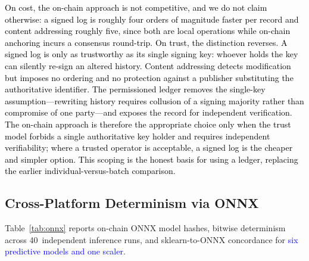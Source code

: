 \documentclass[conference]{IEEEtran}
\newcommand{\rev}[2]{\textcolor{blue}{#2}}
\begin{document}
\textcolor{black}{On cost, the on-chain approach is not competitive,
and we do not claim otherwise: a signed log is roughly four
orders of magnitude faster per record and content addressing
roughly five, since both are local operations while on-chain
anchoring incurs a consensus round-trip. On trust, the
distinction reverses. A signed log is only as trustworthy as
its single signing key: whoever holds the key can silently
re-sign an altered history. Content addressing detects
modification but imposes no ordering and no protection against a
publisher substituting the authoritative identifier. The
permissioned ledger removes the single-key assumption---rewriting
history requires collusion of a signing majority rather than
compromise of one party---and exposes the record for independent
verification. The on-chain approach is therefore the appropriate
choice only when the trust model forbids a single authoritative
key holder and requires independent verifiability; where a
trusted operator is acceptable, a signed log is the cheaper and
simpler option. This scoping is the honest basis for using a
ledger, replacing the earlier individual-versus-batch
comparison.}
\subsection{\textbf{Cross-Platform Determinism via ONNX}}
\label{sec:onnx-results}

Table~\ref{tab:onnx} reports on-chain ONNX model hashes,
bitwise determinism across 40~independent inference runs,
and sklearn-to-ONNX concordance for \rev{R2.1}{six predictive models and one scaler}.
\end{document}
